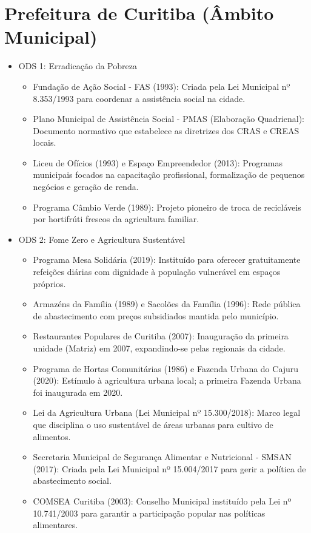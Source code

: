 \section{Prefeitura de Curitiba (Âmbito Municipal)}
\begin{itemize}
\item  ODS 1: Erradicação da Pobreza
\begin{itemize}
\item Fundação de Ação Social - FAS (1993): Criada pela Lei Municipal nº 8.353/1993 para coordenar a assistência social na cidade.
\item Plano Municipal de Assistência Social - PMAS (Elaboração Quadrienal): Documento normativo que estabelece as diretrizes dos CRAS e CREAS locais.
\item Liceu de Ofícios (1993) e Espaço Empreendedor (2013): Programas municipais focados na capacitação profissional, formalização de pequenos negócios e geração de renda.
\item Programa Câmbio Verde (1989): Projeto pioneiro de troca de recicláveis por hortifrúti frescos da agricultura familiar.
\end{itemize}
\item ODS 2: Fome Zero e Agricultura Sustentável
\begin{itemize}
\item Programa Mesa Solidária (2019): Instituído para oferecer gratuitamente refeições diárias com dignidade à população vulnerável em espaços próprios.
\item Armazéns da Família (1989) e Sacolões da Família (1996): Rede pública de abastecimento com preços subsidiados mantida pelo município.
\item Restaurantes Populares de Curitiba (2007): Inauguração da primeira unidade (Matriz) em 2007, expandindo-se pelas regionais da cidade.
\item Programa de Hortas Comunitárias (1986) e Fazenda Urbana do Cajuru (2020): Estímulo à agricultura urbana local; a primeira Fazenda Urbana foi inaugurada em 2020.
\item Lei da Agricultura Urbana (Lei Municipal nº 15.300/2018): Marco legal que disciplina o uso sustentável de áreas urbanas para cultivo de alimentos.
\item Secretaria Municipal de Segurança Alimentar e Nutricional - SMSAN (2017): Criada pela Lei Municipal nº 15.004/2017 para gerir a política de abastecimento social.
\item COMSEA Curitiba (2003): Conselho Municipal instituído pela Lei nº 10.741/2003 para garantir a participação popular nas políticas alimentares.
\end{itemize}
\end{itemize}

